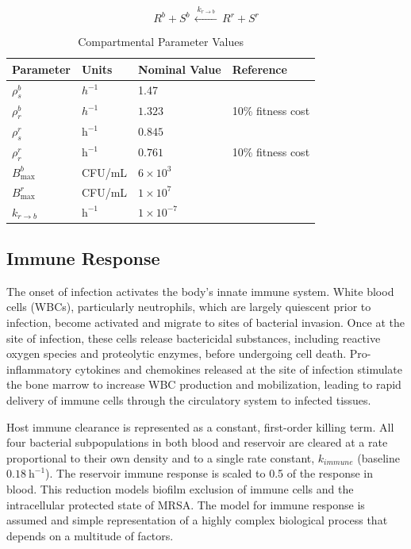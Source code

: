 \documentclass[journal]{IEEEtran}
\begin{document}
\begin{equation}
R^{b} + S^{b}
\,
\xleftarrow{\;k_{r \to b}\;}
\,
R^{r} + S^{r}
\end{equation}

\begin{table}[!t]
\centering
\renewcommand{\arraystretch}{1.35}
\caption{Compartmental Parameter Values}\label{tab:Comparsms}
\begin{tabular}{l l l l}
\hline
\textbf{Parameter} & \textbf{Units} & \textbf{Nominal Value} & \textbf{Reference} \\
\hline
$\rho_s^{b}$ & $h^{-1}$ & 1.47 & \cite{VeraYunca2025}\\
$\rho_r^{b}$ & $h^{-1}$ & $1.323$ &  10\% fitness cost  \\
$\rho_{s}^{r}$         & $\text{h}^{-1}$     & $0.845$             & \cite{VeraYunca2025} \\
$\rho_{r}^{r}$         & $\text{h}^{-1}$     & $0.761$             & 10\% fitness cost\\
$B_{\max}^{b}$ & CFU/mL & $6 \times 10^3$ & \cite{nieman2022bacterial} \\
$B_{\max}^{r}$         & CFU/mL              & $1 \times 10^{7}$   & \cite{VeraYunca2025}\\
$k_{r \to b}$          & $\text{h}^{-1}$     & $1 \times 10^{-7}$ & \cite{Kostakioti2013} \\
\hline
\end{tabular}
\end{table}

\subsection{Immune Response}
The onset of infection activates the body's innate immune system. White blood cells (WBCs), particularly
neutrophils, which are largely quiescent prior to infection, become activated and migrate to sites of bacterial invasion.
Once at the site of infection, these cells release bactericidal substances, including reactive oxygen species and proteolytic enzymes,
before undergoing cell death. Pro-inflammatory cytokines and chemokines released at the site of infection stimulate
the bone marrow to increase WBC production and mobilization, leading to rapid delivery of immune cells through the circulatory
system to infected tissues.

Host immune clearance is represented as a constant, first-order killing
term. All four bacterial subpopulations in both blood and
reservoir are cleared at a rate proportional to their own density and to
a single rate constant, $k_{immune}$ (baseline $0.18~\mathrm{h^{-1}}$).
The reservoir immune response is scaled to 0.5 of the response in blood. This
reduction models biofilm exclusion of immune cells and the intracellular protected state of MRSA.
The model for immune response is assumed and simple representation
of a highly complex biological process that depends on a multitude of factors.
\end{document}
